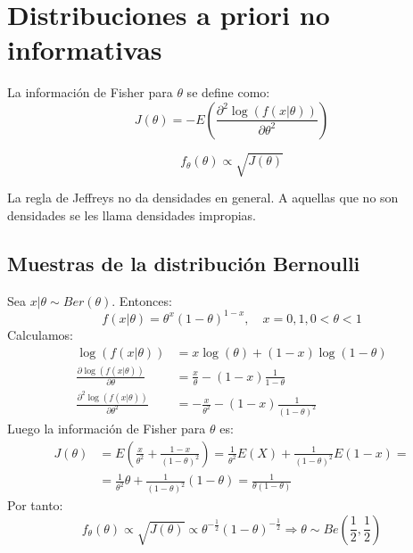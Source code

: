 \section{Distribuciones a priori no informativas}
\begin{definition}
    La información de Fisher para $\theta$ se define como:
    $$J(\theta) = -E\left(\frac{\partial^2 \log(f(x|\theta))}{\partial\theta^2}\right)$$
\end{definition}

\begin{proposition}
    $$f_\theta(\theta) \propto \sqrt{J(\theta)}$$
\end{proposition}

\begin{remark}
    La regla de Jeffreys no da densidades en general.
    A aquellas que no son densidades se les llama densidades impropias.
\end{remark}

\subsection*{Muestras de la distribución Bernoulli}
Sea $x|\theta \sim Ber(\theta)$.
Entonces:
$$f(x|\theta) = \theta^x(1-\theta)^{1-x}, \quad x = 0, 1, 0 < \theta < 1$$
Calculamos:
\begin{align*}
    \log(f(x|\theta))                                      & = x\log(\theta) + (1-x)\log(1-\theta)               \\
    \frac{\partial \log(f(x|\theta))}{\partial \theta}     & = \frac{x}{\theta} - (1-x)\frac{1}{1-\theta}        \\
    \frac{\partial^2 \log(f(x|\theta))}{\partial \theta^2} & = -\frac{x}{\theta^2} - (1-x)\frac{1}{(1-\theta)^2}
\end{align*}
Luego la información de Fisher para $\theta$ es:
\begin{align*}
    J(\theta) & = E\left(\frac{x}{\theta^2} + \frac{1-x}{(1-\theta)^2}\right) = \frac{1}{\theta^2}E(X) + \frac{1}{(1-\theta)^2}E(1-x) = \\
              & = \frac{1}{\theta^2}\theta + \frac{1}{(1-\theta)^2}(1-\theta) = \frac{1}{\theta(1-\theta)}
\end{align*}
Por tanto:
$$f_\theta(\theta) \propto \sqrt{J(\theta)} \propto \theta^{-\frac{1}{2}}(1-\theta)^{-\frac{1}{2}} \Rightarrow \theta \sim Be(\frac{1}{2}, \frac{1}{2})$$

